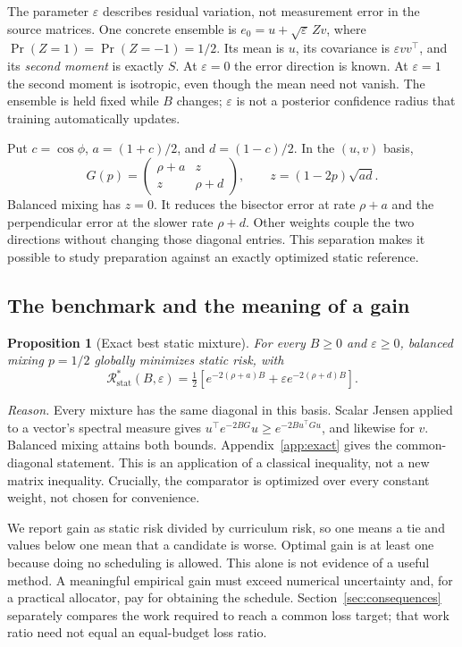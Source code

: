 \documentclass{article}
\newtheorem{proposition}[theorem]{Proposition}
\theoremstyle{remark}\newtheorem{remark}[theorem]{Remark}
\newcommand{\R}{\mathcal R}
\newcommand{\Rs}{\R_{\mathrm{stat}}^*}
\begin{document}
The parameter $\varepsilon$ describes residual variation, not measurement error in the source matrices. One concrete ensemble is $e_0=u+\sqrt\varepsilon\,Z v$, where $\Pr(Z=1)=\Pr(Z=-1)=1/2$. Its mean is $u$, its covariance is $\varepsilon vv^\top$, and its \emph{second moment} is exactly $S$. At $\varepsilon=0$ the error direction is known. At $\varepsilon=1$ the second moment is isotropic, even though the mean need not vanish. The ensemble is held fixed while $B$ changes; $\varepsilon$ is not a posterior confidence radius that training automatically updates.

Put $c=\cos\phi$, $a=(1+c)/2$, and $d=(1-c)/2$. In the $(u,v)$ basis,
\begin{equation}
 G(p)=\begin{pmatrix}\rho+a&z\\z&\rho+d\end{pmatrix},\qquad
 z=(1-2p)\sqrt{ad}.\label{eq:mirror}
\end{equation}
Balanced mixing has $z=0$. It reduces the bisector error at rate $\rho+a$ and the perpendicular error at the slower rate $\rho+d$. Other weights couple the two directions without changing those diagonal entries. This separation makes it possible to study preparation against an exactly optimized static reference.

\subsection{The benchmark and the meaning of a gain}
\begin{proposition}[Exact best static mixture]\label{main:static}
For every $B\ge0$ and $\varepsilon\ge0$, balanced mixing $p=1/2$ globally minimizes static risk, with
\begin{equation}
 \boxed{\Rs(B,\varepsilon)=\tfrac12\left[e^{-2(\rho+a)B}+\varepsilon e^{-2(\rho+d)B}\right].}\label{eq:mainstatic}
\end{equation}
\end{proposition}
\emph{Reason.} Every mixture has the same diagonal in this basis. Scalar Jensen applied to a vector's spectral measure gives $u^\top e^{-2BG}u\ge e^{-2B u^\top Gu}$, and likewise for $v$. Balanced mixing attains both bounds. Appendix~\ref{app:exact} gives the common-diagonal statement. This is an application of a classical inequality, not a new matrix inequality. Crucially, the comparator is optimized over every constant weight, not chosen for convenience.

We report gain as static risk divided by curriculum risk, so one means a tie and values below one mean that a candidate is worse. Optimal gain is at least one because doing no scheduling is allowed. This alone is not evidence of a useful method. A meaningful empirical gain must exceed numerical uncertainty and, for a practical allocator, pay for obtaining the schedule. Section~\ref{sec:consequences} separately compares the work required to reach a common loss target; that work ratio need not equal an equal-budget loss ratio.
\end{document}
